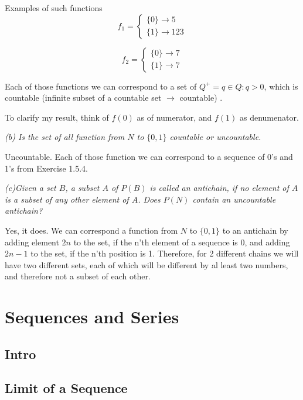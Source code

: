 \documentclass[11pt,oneside,titlepage]{book}
\begin{document}
Examples of such functions
\begin{equation}
  f_1 =
  \begin{cases}
    \{0\} \to 5 \\
    \{1\} \to 123
  \end{cases}
\end{equation}

\begin{equation}
  f_2 =
  \begin{cases}
    \{0\} \to 7 \\
    \{1\} \to 7
  \end{cases}
\end{equation}

Each of those functions we can correspond to a set of $Q^+ = {q \in Q: q > 0}$,
which is countable (infinite subset of a countable set $\to$ countable) .

To clarify my result, think of $f(0)$ as of numerator, and $f(1)$ as denumenator.

\textit{(b) Is the set of all function from $N$ to $\{0, 1\}$ countable or uncountable.}

Uncountable. Each of those function we can correspond to a sequence of 0's and 1's from
Exercise 1.5.4.

\textit{(c)Given a set $B$, a subset $A$ of $P(B)$ is called an antichain, if no
  element of $A$ is a subset of any other element of $A$. Does $P(N)$ contain an
  uncountable antichain?}

Yes, it does. We can correspond a function from $N$ to $\{0, 1\}$ to an antichain
by adding element $2n$ to the set, if the n'th element of a sequence is 0, and
adding $2n - 1$ to the set, if the n'th position is 1. Therefore, for
2 different chains we will have two different sets, each of which will be
different by al least two numbers, and therefore not a subset of each other.

\chapter{Sequences and Series}

\section{Intro}

\section{Limit of a Sequence}
\end{document}
